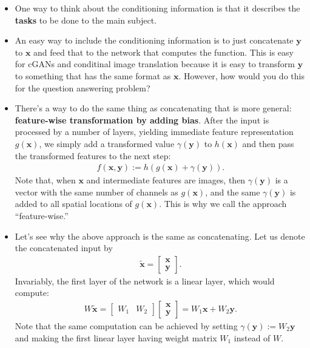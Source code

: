 \documentclass[10pt]{article}
\newcommand{\ve}[1]{\mathbf{#1}}
\begin{document}
\begin{itemize}
  	\item One way to think about the conditioning information is that it describes the \textbf{tasks} to be done to the main subject.

  	\item An easy way to include the conditioning information is to just concatenate $\ve{y}$ to $\ve{x}$ and feed that to the network that computes the function. This is easy for cGANs and conditinal image translation because it is easy to transform $\ve{y}$ to something that has the same format as $\ve{x}$. However, how would you do this for the question answering problem?

  	\item There's a way to do the same thing as concatenating that is more general: \textbf{feature-wise transformation by adding bias}. After the input is processed by a number of layers, yielding immediate feature representation $g(\ve{x})$, we simply add a transformed value $\gamma(\ve{y})$ to $h(\ve{x})$ and then pass the transformed features to the next step:
  	\begin{align*}
  		f(\ve{x},\ve{y}) := h(g(\ve{x}) + \gamma(\ve{y})).
  	\end{align*}
  	Note that, when $\ve{x}$ and intermediate features are images, then $\gamma(\ve{y})$ is a vector with the same number of channels as $g(\ve{x})$, and the same $\gamma(\ve{y})$ is added to all spatial locations of $g(\ve{x}).$ This is why we call the approach ``feature-wise.''

  	\item Let's see why the above approach is the same as concatenating. Let us denote the concatenated input by
  	\begin{align*}
  		\tilde{\ve{x}} = \begin{bmatrix} \ve{x} \\ \ve{y} \end{bmatrix}.
  	\end{align*}
  	Invariably, the first layer of the network is a linear layer, which would compute:
  	\begin{align*}
  		W \tilde{\ve{x}} 
  		= \begin{bmatrix} W_1 & W_2 \end{bmatrix} 
  		\begin{bmatrix} \ve{x} \\ \ve{y} \end{bmatrix}
  		= W_1 \ve{x} + W_2 \ve{y}.
  	\end{align*}
  	Note that the same computation can be achieved by setting $\gamma(\ve{y} ) := W_2 \ve{y}$ and making the first linear layer having weight matrix $W_1$ instead of $W$.


\end{itemize}
\end{document}
